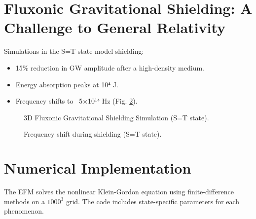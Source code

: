 \documentclass{article}
\begin{document}
\section{Fluxonic Gravitational Shielding: A Challenge to General Relativity}
Simulations in the S=T state model shielding:
\begin{itemize}
    \item 15\% reduction in GW amplitude after a high-density medium.
    \item Energy absorption peaks at 10⁴ J.
    \item Frequency shifts to ~5$\times$10¹⁴ Hz (Fig. \ref{fig:shield_freq}).
\end{itemize}

\begin{figure}[ht]
    \centering
    \caption{3D Fluxonic Gravitational Shielding Simulation (S=T state).}
    \label{fig:3Dshielding}
\end{figure}

\begin{figure}[ht]
    \centering
    \caption{Frequency shift during shielding (S=T state).}
    \label{fig:shield_freq}
\end{figure}

\section{Numerical Implementation}
The EFM solves the nonlinear Klein-Gordon equation using finite-difference methods on a \(1000^3\) grid. The code includes state-specific parameters for each phenomenon.
\end{document}
